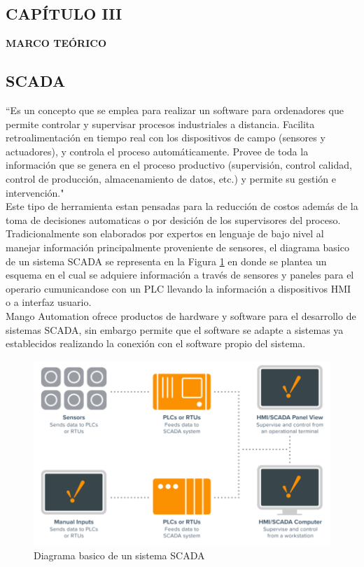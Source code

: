 \begin{center}
    \setcounter{section}{3}
    \setcounter{subsection}{0}
    \section*{CAPÍTULO III}
    \vspace*{0.5in}
    \textbf{MARCO TEÓRICO}
\end{center}

\subsection{SCADA}
    ``Es un concepto que se emplea para realizar un software 
    para ordenadores que permite controlar y supervisar 
    procesos industriales a distancia. Facilita 
    retroalimentación en tiempo real con los 
    dispositivos de campo (sensores y actuadores), y 
    controla el proceso automáticamente. Provee de toda 
    la información que se genera en el proceso 
    productivo (supervisión, control calidad, control de
    producción, almacenamiento de datos, etc.) y 
    permite su gestión e intervención." \textcolor{blue}{\cite{SCADA}}\\

    Este tipo de herramienta estan pensadas para la reducción de costos además de la toma de decisiones automaticas o por 
    desición de los supervisores del proceso. Tradicionalmente son elaborados por expertos en lenguaje de bajo nivel 
    al manejar información principalmente proveniente de sensores, el diagrama basico de un sistema SCADA se representa
    en la Figura \ref{fig:estructura} en donde se plantea un esquema en el cual se adquiere información a través de sensores
    y paneles para el operario cumunicandose con un PLC llevando la información a dispositivos HMI o a interfaz usuario. \\

    Mango Automation ofrece productos de hardware y software para el desarrollo de sistemas SCADA, sin embargo permite que 
    el software se adapte a sistemas ya establecidos realizando la conexión con el software propio del sistema. 
    \begin{figure}[H]
        \centering
        \includegraphics[scale=0.4]
        {EstructuraSCADA.png}
        \caption{Diagrama basico de un sistema SCADA}
    \label{fig:estructura}
    \end{figure}

